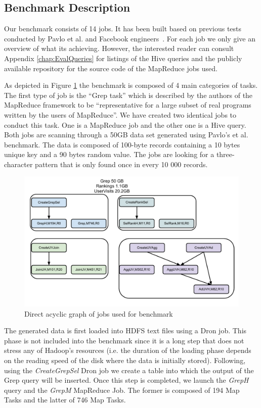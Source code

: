 \documentclass[11pt,a4paper,twoside]{report}
\begin{document}
\subsection{Benchmark Description}
Our benchmark consists of 14 jobs. It has been built based on previous tests conducted by Pavlo et al. and Facebook engineers~\cite{PavloBenchmark, HiveBenchmark}. For each job we only give an overview of what its achieving. However, the interested reader can consult Appendix \ref{chap:EvalQueries} for listings of the Hive queries and the publicly available repository for the source code of the MapReduce jobs used.


As depicted in Figure \ref{fig:TestDAG} the benchmark is composed of 4 main categories of tasks. The first type of job is the ``Grep task'' which is described by the authors of the MapReduce framework to be ``representative for a large subset of real programs written by the users of MapReduce''\cite{MapReduce}. We have created two identical jobs to conduct this task. One is a MapReduce job and the other one is a Hive query. Both jobs are scanning through a 50GB data set generated using Pavlo's et al. benchmark. The data is composed of 100-byte records containing a 10 bytes unique key and a 90 bytes random value. The jobs are looking for a three-character pattern that is only found once in every 10 000 records.


\begin{figure}[h]
\centering
\includegraphics[scale=0.66]{TestDAG}
\caption{Direct acyclic graph of jobs used for benchmark}
\label{fig:TestDAG}
\end{figure}


The generated data is first loaded into HDFS text files using a Dron job. This phase is not included into the benchmark since it is a long step that does not stress any of Hadoop's resources (i.e. the duration of the loading phase depends on the reading speed of the disk where the data is initially stored). Following,
using the \textit{CreateGrepSel} Dron job we create a table into which the output of the Grep query will be inserted. Once this step is completed, we launch the
\textit{GrepH} query and the \textit{GrepM} MapReduce Job. The former is composed of 194 Map Tasks and the latter of 746 Map Tasks.
\end{document}
